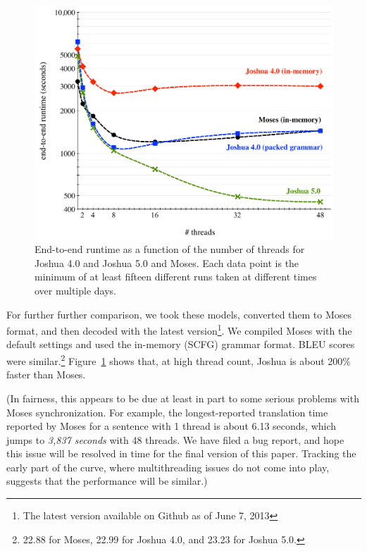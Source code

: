\documentclass[11pt]{article}
\begin{document}
\begin{figure}[!t]
  \begin{center}
    \includegraphics[width=0.99\linewidth]{figures/comparison.pdf}
  \end{center}
  \caption{End-to-end runtime as a function of the number of threads
    for Joshua 4.0 and Joshua 5.0 and Moses. Each data point is the
    minimum of at least fifteen different runs taken at different
    times over multiple days.}
  \label{fig:cmp}
\end{figure}

For further further comparison, we took these models, converted them
to Moses format, and then decoded with the latest version\footnote{The
  latest version available on Github as of June 7, 2013}.  We compiled
Moses with the default settings and used the in-memory (SCFG) grammar
format.  BLEU scores were similar.\footnote{22.88 for Moses, 22.99 for
  Joshua 4.0, and 23.23 for Joshua 5.0.}  Figure~\ref{fig:cmp} shows
that, at high thread count, Joshua is about 200\% faster than
Moses.

(In fairness, this appears to be due at least in part to some serious
problems with Moses synchronization. For example, the longest-reported
translation time reported by Moses for a sentence with 1 thread is
about 6.13 seconds, which jumps to \emph{3,837 seconds} with 48
threads. We have filed a bug report, and hope this issue will be
resolved in time for the final version of this paper. Tracking the
early part of the curve, where multithreading issues do not come into
play, suggests that the performance will be similar.)
\end{document}
